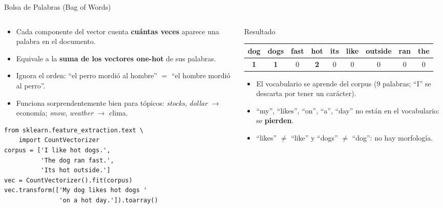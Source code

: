 \documentclass[aspectratio=169, 10pt]{beamer}
\begin{document}
\begin{frame}[fragile]{Bolsa de Palabras (Bag of Words)}

	\begin{columns}[T]
		\begin{column}{0.48\textwidth}
			\begin{itemize}
				\small
				\item Cada componente del vector cuenta \textbf{cu\'antas veces} aparece una palabra en el documento.
				\item Equivale a la \textbf{suma de los vectores one-hot} de sus palabras.
				\item Ignora el orden: ``el perro mordi\'o al hombre'' $=$ ``el hombre mordi\'o al perro''.
				\item Funciona sorprendentemente bien para t\'opicos: \emph{stocks}, \emph{dollar} $\to$ econom\'ia; \emph{snow}, \emph{weather} $\to$ clima.
			\end{itemize}

			\vspace{0.2cm}

			\begin{tcolorbox}[codebox]
\scriptsize
\begin{verbatim}
from sklearn.feature_extraction.text \
    import CountVectorizer
corpus = ['I like hot dogs.',
          'The dog ran fast.',
          'Its hot outside.']
vec = CountVectorizer().fit(corpus)
vec.transform(['My dog likes hot dogs '
               'on a hot day.']).toarray()
\end{verbatim}
			\end{tcolorbox}
		\end{column}

		\begin{column}{0.49\textwidth}
			\begin{block}{Resultado}
				\centering
				\scriptsize
				\setlength{\tabcolsep}{3pt}
				\begin{tabular}{ccccccccc}
					\toprule
					dog & dogs & fast & hot & its & like & outside & ran & the \\
					\midrule
					\textbf{1} & \textbf{1} & 0 & \textbf{2} & 0 & 0 & 0 & 0 & 0 \\
					\bottomrule
				\end{tabular}
			\end{block}

			\begin{itemize}
				\small
				\item El vocabulario se aprende del corpus (9 palabras; ``I'' se descarta por tener un car\'acter).
				\item ``my'', ``likes'', ``on'', ``a'', ``day'' no est\'an en el vocabulario: se \textbf{pierden}.
				\item ``likes'' $\neq$ ``like'' y ``dogs'' $\neq$ ``dog'': no hay morfolog\'ia.
			\end{itemize}
		\end{column}
	\end{columns}

\end{frame}
\end{document}
